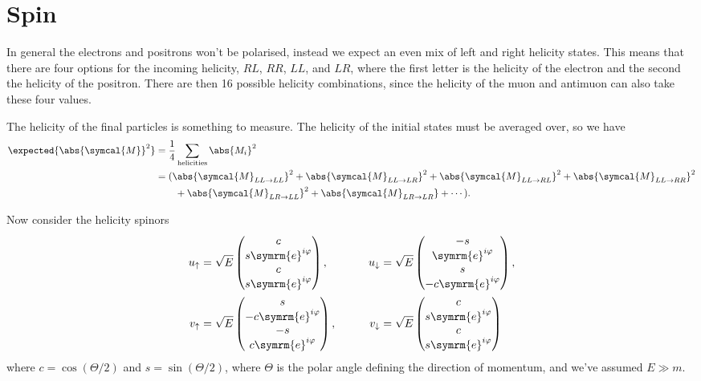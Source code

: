 \documentclass[fleqn]{NotesClass}
\newcommand{\e}{\symrm{e}}
\newcommand{\amplitude}{\symcal{M}}
\begin{document}
    \section{Spin}
    In general the electrons and positrons won't be polarised, instead we expect an even mix of left and right helicity states.
    This means that there are four options for the incoming helicity, \(RL\), \(RR\), \(LL\), and \(LR\), where the first letter is the helicity of the electron and the second the helicity of the positron.
    There are then 16 possible helicity combinations, since the helicity of the muon and antimuon can also take these four values.
    
    The helicity of the final particles is something to measure.
    The helicity of the initial states must be averaged over, so we have
    \begin{align}
        \expected{\abs{\amplitude}^2} &= \frac{1}{4} \sum_{\text{helicities}} \abs{M_i}^2\\
        &= (\abs{\amplitude_{LL \to LL}}^2 + \abs{\amplitude_{LL \to LR}}^2 + \abs{\amplitude_{LL \to RL}}^2 + \abs{\amplitude_{LL \to RR}}^2\\
        &\qquad + \abs{\amplitude_{LR \to LL}}^2 + \abs{\amplitude_{LR \to LR}} + \dotsb).
    \end{align}
    
    Now consider the helicity spinors
    \begin{alignat}{2}
        u_{\uparrow} &= \sqrt{E}
        \begin{pmatrix}
            c\\ s\e^{i\varphi}\\ c\\ s\e^{i\varphi}
        \end{pmatrix}
        , \qquad & u_{\downarrow} &= \sqrt{E}
        \begin{pmatrix}
            -s\\ \e^{i\varphi}\\ s\\ -c\e^{i\varphi}
        \end{pmatrix}
        ,\\
        v_{\uparrow} &= \sqrt{E}
        \begin{pmatrix}
            s\\ -c\e^{i\varphi}\\ -s\\ c\e^{i\varphi}
        \end{pmatrix}
        ,\qquad & v_{\downarrow} &= \sqrt{E}
        \begin{pmatrix}
            c\\ s\e^{i\varphi}\\ c\\ s\e^{i\varphi}
        \end{pmatrix}
    \end{alignat}
    where \(c = \cos(\Theta/2)\) and \(s = \sin(\Theta/2)\), where \(\Theta\) is the polar angle defining the direction of momentum, and we've assumed \(E \gg m\).
    
\end{document}
